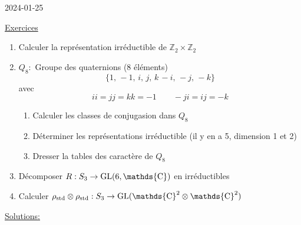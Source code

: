 


2024-01-25

\underline{Exercices} 

\begin{enumerate}
	\item Calculer la représentation irréductible de $\mathds{Z}_2 \times  \mathds{Z}_2 $
	\item $Q_8:$ Groupe des quaternions (8 éléments) \[ \{ 1,\, -1,\, i,\, j,\, k\, -i,\, -j,\, -k \}  \] avec \[ ii = jj = kk = -1 \qquad -ji = ij = -k \]
		\begin{enumerate}
			\item Calculer les classes de conjugasion dans $Q_8$
			\item Déterminer les représentations irréductible (il y en a 5, dimension 1 et 2)
			\item Dresser la tables des caractère de $Q_8$
		\end{enumerate}
	\item Décomposer $R:S_3 \to \rm{GL}(6, \mathds{C})$ en irréductibles
	\item Calculer $\rho_{\text{std}} \otimes \rho_{\text{std}}: S_3 \to	\rm{GL} (\mathds{C}^2 \otimes	\mathds{C}^2)  $
\end{enumerate}

\underline{Solutions:} 

